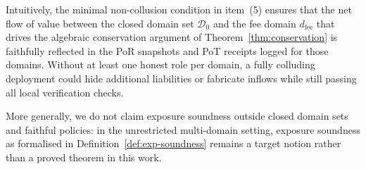 \documentclass[11pt]{article}
\begin{document}
Intuitively, the minimal non-collusion condition in item~(5) ensures that the net flow of value
between the closed domain set $\mathcal{D}_0$ and the fee domain $d_{\mathrm{fee}}$ that drives
the algebraic conservation argument of Theorem~\ref{thm:conservation} is faithfully reflected
in the PoR snapshots and PoT receipts logged for those domains.
Without at least one honest role per domain, a fully colluding deployment could hide additional
liabilities or fabricate inflows while still passing all local verification checks.

More generally, we do not claim exposure soundness outside closed domain sets and faithful policies: in the unrestricted multi-domain setting, exposure soundness as formalised in Definition~\ref{def:exp-soundness} remains a target notion rather than a proved theorem in this work.
\end{document}
